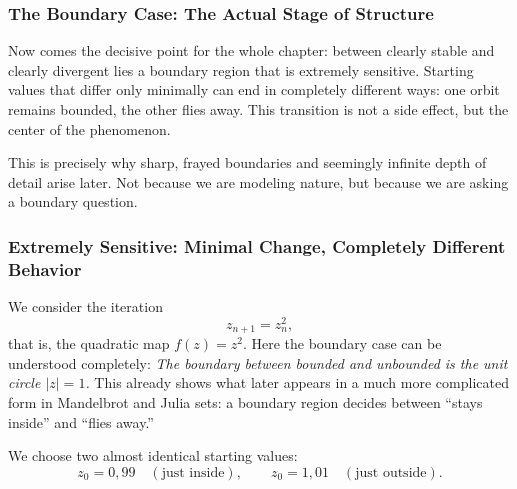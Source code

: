 \newpage
\noindent

\subsubsection*{The Boundary Case: The Actual Stage of Structure}

Now comes the decisive point for the whole chapter:
between clearly stable and clearly divergent lies a boundary region that is extremely sensitive.
Starting values that differ only minimally can end in completely different ways:
one orbit remains bounded, the other flies away.
This transition is not a side effect, but the center of the phenomenon.

This is precisely why sharp, frayed boundaries and seemingly infinite depth of detail arise later.
Not because we are modeling nature,
but because we are asking a boundary question.

\subsubsection*{Extremely Sensitive: Minimal Change, Completely Different Behavior}

We consider the iteration
\[
z_{n+1}=z_n^2,
\]
that is, the quadratic map $f(z)=z^2$.
Here the boundary case can be understood completely:
\emph{The boundary between bounded and unbounded is the unit circle $|z|=1$.}
This already shows what later appears in a much more complicated form
in Mandelbrot and Julia sets:
a boundary region decides between ``stays inside'' and ``flies away.''

We choose two almost identical starting values:
\[
z_0=0{,}99 \quad (\text{just inside}), 
\qquad z_0=1{,}01 \quad (\text{just outside}).
\]

